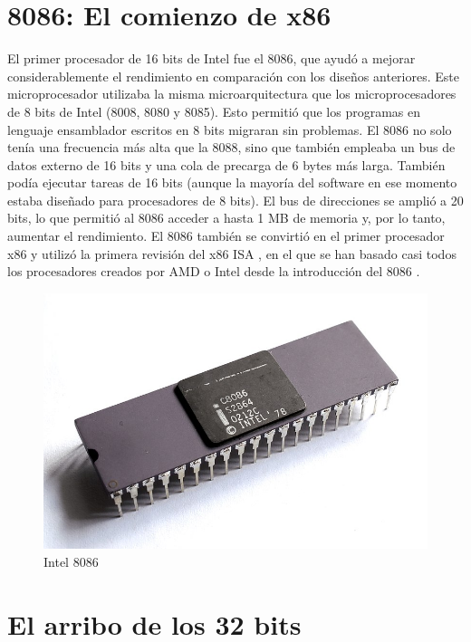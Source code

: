 \section{8086: El comienzo de x86}
El primer procesador de 16 bits de Intel fue el 8086, que ayudó a mejorar considerablemente el rendimiento en comparación con los diseños anteriores.
Este microprocesador utilizaba la misma microarquitectura que los microprocesadores de 8 bits de Intel (8008, 8080 y 8085). Esto permitió que los programas 
en lenguaje ensamblador escritos en 8 bits migraran sin problemas. El 8086 no solo tenía una frecuencia más alta que la 8088, sino que también empleaba un 
bus de datos externo de 16 bits y una cola de precarga de 6 bytes más larga. También podía ejecutar tareas de 16 bits (aunque la mayoría del software en ese 
momento estaba diseñado para procesadores de 8 bits). El bus de direcciones se amplió a 20 bits, lo que permitió al 8086 acceder a hasta 1 MB de memoria y, 
por lo tanto, aumentar el rendimiento. El 8086 también se convirtió en el primer procesador x86 y utilizó la primera revisión del x86 
ISA , en el que se han basado casi todos los procesadores creados por AMD o Intel desde la introducción del 8086 
.

\begin{figure}[htb]
	\centering
	\includegraphics[scale = 0.2]{Graphics/Intel_C8086.jpg}
	\caption{Intel 8086}
	\label{fig:16}
\end{figure}

\section{El arribo de los 32 bits}

